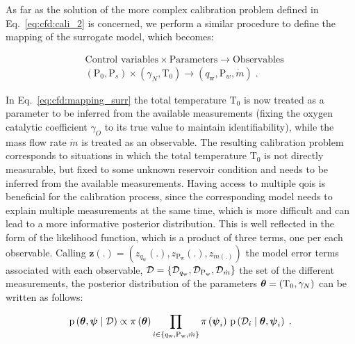 \bigskip
As far as the solution of the more complex calibration problem defined in Eq.~\eqref{eq:cfd:cali_2} is concerned, we perform a similar procedure to define the mapping of the surrogate model, which becomes:

\begin{equation}
    \left.
    \begin{aligned}
        &\text{Control variables} \times \text{Parameters} \rightarrow \text{Observables} \\
        &\left( \text{P}_0, \text{P}_s\right) \times (\gamma_N, \mathrm{T}_0) \rightarrow \left( q_{\mathrm{w}}, \text{P}_w, \dot{m}\right) \;.
    \end{aligned}
    \right.
    \label{eq:cfd:mapping_surr}
\end{equation}

In Eq.~\eqref{eq:cfd:mapping_surr} the total temperature $\mathrm{T}_0$ is now treated as a parameter to be inferred from the available measurements (fixing the oxygen catalytic coefficient $\gamma_O$ to its true value to maintain identifiability), while the mass flow rate $\dot{m}$ is treated as an observable. The resulting calibration problem corresponds to situations in which the total temperature $\mathrm{T}_0$ is not directly measurable, but fixed to some unknown reservoir condition and needs to be inferred from the available measurements. Having access to multiple \glspl{qoi} is beneficial for the calibration process, since the corresponding model needs to explain multiple measurements at the same time, which is more difficult and can lead to a more informative posterior distribution. This is well reflected in the form of the likelihood function, which is a product of three terms, one per each observable. Calling $\mathbf{z}(.) = (z_{q_{\mathrm{w}}}(.), z_{\mathrm{P}_{\mathrm{w}}}(.), z_{\dot{m}(.)})$ the model error terms associated with each observable, $\mathcal{D} = \{\mathcal{D}_{q_{\mathrm{w}}}, \mathcal{D}_{\mathrm{P}_{\mathrm{w}}}, \mathcal{D}_{\dot{m}}\}$ the set of the different measurements, the posterior distribution of the parameters $\boldsymbol{\theta} = (\mathrm{T}_0, \gamma_N)$ can be written as follows:

\begin{equation}
  \mathrm{p} \left( \boldsymbol{\theta}, \boldsymbol{\psi} \mid \mathcal{D} \right) \propto \pi \left( \boldsymbol{\theta}\right) \prod_{i \in \{q_{\mathrm{w}}, \mathrm{P}_{\mathrm{w}}, \dot{m}\}} \pi \left( \boldsymbol{\psi}_i\right) \, \mathrm{p} \left( \mathcal{D}_i \mid \boldsymbol{\theta}, \boldsymbol{\psi}_i \right) \;.
  \label{eq:cfd:multi_post}
\end{equation}

